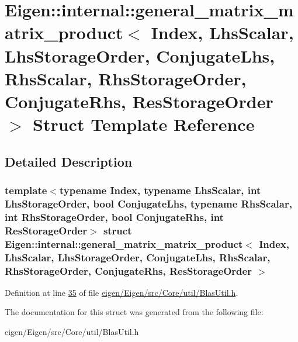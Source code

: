 \hypertarget{struct_eigen_1_1internal_1_1general__matrix__matrix__product}{}\section{Eigen\+:\+:internal\+:\+:general\+\_\+matrix\+\_\+matrix\+\_\+product$<$ Index, Lhs\+Scalar, Lhs\+Storage\+Order, Conjugate\+Lhs, Rhs\+Scalar, Rhs\+Storage\+Order, Conjugate\+Rhs, Res\+Storage\+Order $>$ Struct Template Reference}
\label{struct_eigen_1_1internal_1_1general__matrix__matrix__product}


\subsection{Detailed Description}
\subsubsection*{template$<$typename Index, typename Lhs\+Scalar, int Lhs\+Storage\+Order, bool Conjugate\+Lhs, typename Rhs\+Scalar, int Rhs\+Storage\+Order, bool Conjugate\+Rhs, int Res\+Storage\+Order$>$\newline
struct Eigen\+::internal\+::general\+\_\+matrix\+\_\+matrix\+\_\+product$<$ Index, Lhs\+Scalar, Lhs\+Storage\+Order, Conjugate\+Lhs, Rhs\+Scalar, Rhs\+Storage\+Order, Conjugate\+Rhs, Res\+Storage\+Order $>$}



Definition at line \hyperlink{eigen_2_eigen_2src_2_core_2util_2_blas_util_8h_source_l00035}{35} of file \hyperlink{eigen_2_eigen_2src_2_core_2util_2_blas_util_8h_source}{eigen/\+Eigen/src/\+Core/util/\+Blas\+Util.\+h}.



The documentation for this struct was generated from the following file\+:\begin{DoxyCompactItemize}
\item 
eigen/\+Eigen/src/\+Core/util/\+Blas\+Util.\+h\end{DoxyCompactItemize}
